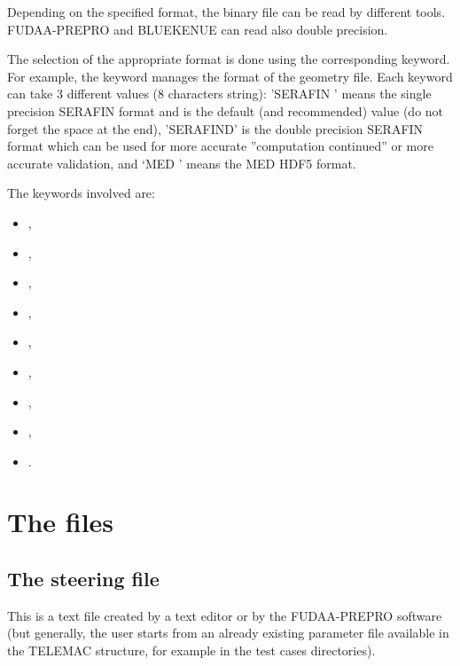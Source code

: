 Depending on the specified format, the binary file can be read by different
tools.
FUDAA-PREPRO and BLUEKENUE can read also double precision.

The selection of the appropriate format is done using the corresponding keyword.
For example, the keyword  manages the format
of the geometry file.
Each keyword can take 3 different values (8 characters string): 'SERAFIN ' means
the single precision SERAFIN format and is the default (and recommended)
value (do not forget the space at the end),
'SERAFIND' is the double precision SERAFIN format which can be used
for more accurate ''computation continued'' or more accurate validation,
and `MED     ' means the MED HDF5 format.

The keywords involved are:

\begin{itemize}
\item {},

\item {},

\item {},

\item {},

\item {},

\item {},

\item {},

\item {},

\item {}.
\end{itemize}


\section{The files}


\subsection{The steering file}

This is a text file created by a text editor or by the FUDAA-PREPRO software
(but generally, the user starts from an already existing parameter file available
in the TELEMAC structure, for example in the test cases directories).

